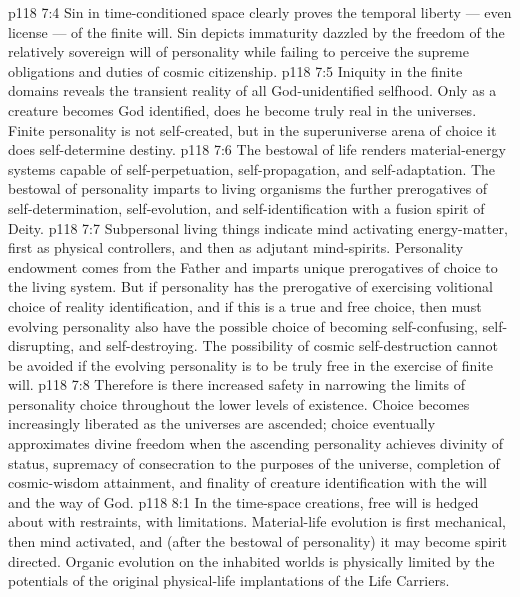 \vs p118 7:4 Sin in time\hyp{}conditioned space clearly proves the temporal liberty --- even license --- of the finite will. Sin depicts immaturity dazzled by the freedom of the relatively sovereign will of personality while failing to perceive the supreme obligations and duties of cosmic citizenship.
\vs p118 7:5 Iniquity in the finite domains reveals the transient reality of all God\hyp{}unidentified selfhood. Only as a creature becomes God identified, does he become truly real in the universes. Finite personality is not self\hyp{}created, but in the superuniverse arena of choice it does self\hyp{}determine destiny.
\vs p118 7:6 \pc The bestowal of life renders material\hyp{}energy systems capable of self\hyp{}perpetuation, self\hyp{}propagation, and self\hyp{}adaptation. The bestowal of personality imparts to living organisms the further prerogatives of self\hyp{}determination, self\hyp{}evolution, and self\hyp{}identification with a fusion spirit of Deity.
\vs p118 7:7 Subpersonal living things indicate mind activating energy\hyp{}matter, first as physical controllers, and then as adjutant mind\hyp{}spirits. Personality endowment comes from the Father and imparts unique prerogatives of choice to the living system. But if personality has the prerogative of exercising volitional choice of reality identification, and if this is a true and free choice, then must evolving personality also have the possible choice of becoming self\hyp{}confusing, self\hyp{}disrupting, and self\hyp{}destroying. The possibility of cosmic self\hyp{}destruction cannot be avoided if the evolving personality is to be truly free in the exercise of finite will.
\vs p118 7:8 Therefore is there increased safety in narrowing the limits of personality choice throughout the lower levels of existence. Choice becomes increasingly liberated as the universes are ascended; choice eventually approximates divine freedom when the ascending personality achieves divinity of status, supremacy of consecration to the purposes of the universe, completion of cosmic\hyp{}wisdom attainment, and finality of creature identification with the will and the way of God.
\vs p118 8:1 In the time\hyp{}space creations, free will is hedged about with restraints, with limitations. Material\hyp{}life evolution is first mechanical, then mind activated, and (after the bestowal of personality) it may become spirit directed. Organic evolution on the inhabited worlds is physically limited by the potentials of the original physical\hyp{}life implantations of the Life Carriers.
